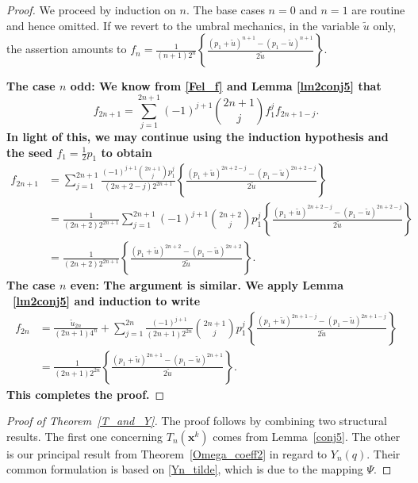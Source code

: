 \documentclass[11pt]{amsart}
\theoremstyle{definition}
\theoremstyle{remark}
\numberwithin{equation}{section}
\begin{document}
\begin{proof} We proceed by induction on $n$. The base cases $n=0$ and $n=1$ are routine and hence omitted.  If we revert to the umbral mechanics, in the variable $\widetilde{u}$ only, the assertion amounts to $f_n=\frac1{(n+1)2^n} \left\{\frac{(p_1+\widetilde{u})^{n+1}-(p_1-\widetilde{u})^{n+1}}{2\widetilde{u}}\right\}$. 

\smallskip

\bf
\noindent The case $n$ odd: \rm We know from \eqref{Fel_f} and Lemma \ref{lm2conj5} that
$$f_{2n+1}= \sum_{j=1}^{2n+1} (-1)^{j+1} \binom{2n+1}j  f_1^j f_{2n+1-j}.$$
 In light of this, we may continue using the induction hypothesis and the seed $f_1=\frac12p_1$ to obtain
\begin{align*}
f_{2n+1} 
& = \sum_{j=1}^{2n+1} \frac{ (-1)^{j+1} \binom{2n+1}j p_1^j}{(2n+2-j)2^{2n+1}} \left\{\frac{(p_1+\widetilde{u})^{2n+2-j}-(p_1-\widetilde{u})^{2n+2-j}}{2\widetilde{u}}\right\}   \\
& = \frac1{(2n+2)2^{2n+1}} \sum_{j=1}^{2n+1} (-1)^{j+1} \binom{2n+2}j p_1^j \left\{\frac{(p_1+\widetilde{u})^{2n+2-j}-(p_1-\widetilde{u})^{2n+2-j}}{2\widetilde{u}}\right\}  \\
& = \frac1{(2n+2)2^{2n+1}} \left\{\frac{(p_1+\widetilde{u})^{2n+2}-(p_1-\widetilde{u})^{2n+2}}{2\widetilde{u}}\right\}.
\end{align*}
\bf The case $n$ even: \rm The argument is similar. We apply Lemma ~\ref{lm2conj5} and induction to write
\begin{align*}
f_{2n} 
& =  \frac{\widetilde{u}_{2n}}{(2n+1)4^n}+ \sum_{j=1}^{2n} \frac{(-1)^{j+1}} {(2n+1)2^{2n}} \binom{2n+1}j p_1^j \left\{\frac{(p_1+\widetilde{u})^{2n+1-j}-(p_1-\widetilde{u})^{2n+1-j}}{2\widetilde{u}}\right\}  \\
& = \frac1{(2n+1)2^{2n}} \left\{\frac{(p_1+\widetilde{u})^{2n+1}-(p_1-\widetilde{u})^{2n+1}}{2\widetilde{u}}\right\}.
\end{align*}
This completes the proof.
\end{proof}

\begin{proof}[Proof of Theorem~\ref{T_and_Y}] The proof follows by combining two structural results.
The first one concerning $T_n(\pmb{x}^k)$ comes from Lemma~\ref{conj5}. The other is our principal result from Theorem~\ref{Omega_coeff2} in regard to $Y_n(q)$. Their common formulation is based on \eqref{Yn_tilde}, which is due to the mapping $\Psi$.
\end{proof}
\end{document}
